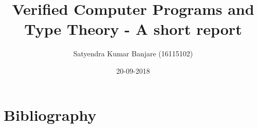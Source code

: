 \documentclass[10pt,twoside,openany]{report}
\title{Verified Computer Programs and Type Theory - A short report}
\author{Satyendra Kumar Banjare (16115102)}
\date{20-09-2018}
\begin{document}
\maketitle




\tableofcontents

















\chapter*{Bibliography}
\lipsum[1]
\lipsum[0]
\end{document}
